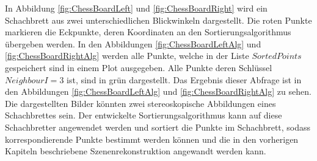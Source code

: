 In Abbildung \ref{fig:ChessBoardLeft} und \ref{fig:ChessBoardRight} wird ein Schachbrett aus zwei unterschiedlichen Blickwinkeln dargestellt. Die roten Punkte markieren die Eckpunkte, deren Koordinaten an den Sortierungsalgorithmus übergeben werden. In den Abbildungen \ref{fig:ChessBoardLeftAlg} und \ref{fig:ChessBoardRightAlg} werden alle Punkte, welche in der Liste $SortedPoints$ gespeichert sind in einem Plot ausgegeben. Alle Punkte deren Schlüssel $NeighbourI = 3$ ist, sind in grün dargestellt. Das Ergebnis dieser Abfrage ist in den Abbildungen \ref{fig:ChessBoardLeftAlg} und \ref{fig:ChessBoardRightAlg} zu sehen. Die dargestellten Bilder könnten zwei stereoskopische Abbildungen eines Schachbrettes sein. Der entwickelte Sortierungsalgorithmus kann auf diese Schachbretter angewendet werden und sortiert die Punkte im Schachbrett, sodass korrespondierende Punkte bestimmt werden können und die in den vorherigen Kapiteln beschriebene Szenenrekonstruktion angewandt werden kann. 





